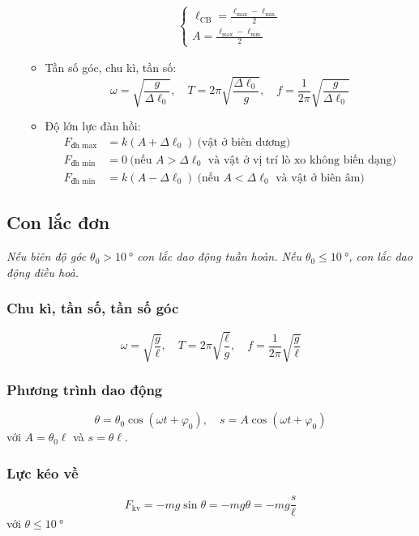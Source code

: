 \begin{itemize}
\begin{itemize}
\begin{align*}
\begin{cases}
			\ell_\text{CB}=\frac{\ell_\text{max}-\ell_\text{min}}{2}\\
			A=\frac{\ell_\text{max}-\ell_\text{min}}{2}
		\end{cases}
	\end{align*}
	\item Tần số góc, chu kì, tần số: 
	$$\omega=\sqrt{\dfrac{g}{\Delta \ell_0}}, \quad T=2\pi\sqrt{\dfrac{\Delta\ell_0}{g}},\quad f=\dfrac{1}{2\pi}\sqrt{\dfrac{g}{\Delta\ell_0}}$$
	\item Độ lớn lực đàn hồi:
	\begin{align*}
		F_\text{đh max}&=k\left(A+\Delta\ell_0\right)\ \text{(vật ở biên dương)}\\
		F_\text{đh min}&=0\ \text{(nếu $A>\Delta\ell_0$ và vật ở vị trí lò xo không biến dạng)}\\
		F_\text{đh min}&=k\left(A-\Delta\ell_0\right)\ \text{(nếu $A<\Delta\ell_0$ và vật ở biên âm)}
	\end{align*}
\end{itemize}
\end{itemize}
\subsection{Con lắc đơn}
\textit{Nếu biên độ góc $\theta_0>\SI{10}{\degree}$ con lắc dao động tuần hoàn. Nếu $\theta_0\le\SI{10}{\degree}$, con lắc dao động điều hoà.}
\subsubsection{Chu kì, tần số, tần số góc}
$$\omega=\sqrt{\dfrac{g}{\ell}}, \quad T=2\pi\sqrt{\dfrac{\ell}{g}}, \quad f=\dfrac{1}{2\pi}\sqrt{\dfrac{g}{\ell}}$$
\subsubsection{Phương trình dao động}
$$\theta=\theta_0\cos\left(\omega t+\varphi_0\right), \quad s=A\cos\left(\omega t+\varphi_0\right)$$
với $A=\theta_0\ell$ và $s=\theta\ell$.
\subsubsection{Lực kéo về}
$$F_\text{kv}=-mg\sin\theta=-mg\theta=-mg\dfrac{s}{\ell}$$
với $\theta\le\SI{10}{\degree}$
